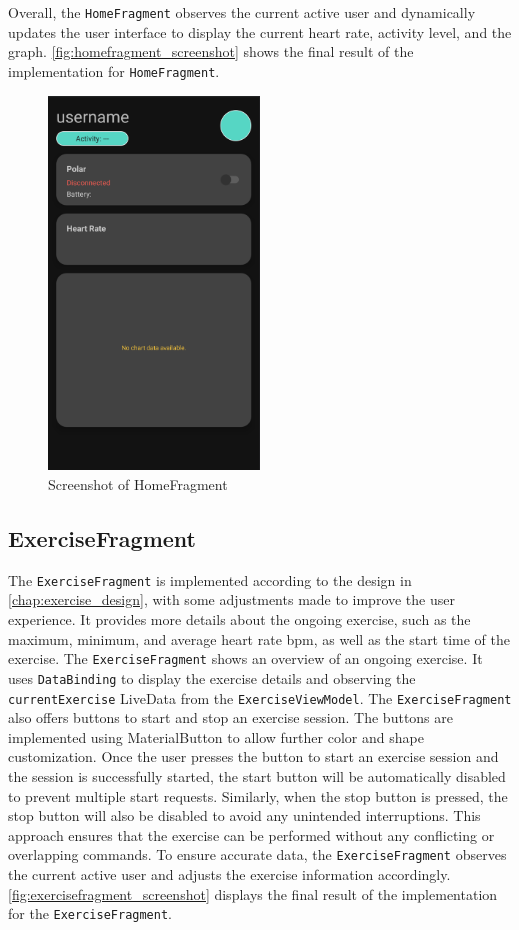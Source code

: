 Overall, the \texttt{HomeFragment} observes the current active user and dynamically updates the user interface to display the current heart rate, activity level, and the graph.
\autoref{fig:homefragment_screenshot} shows the final result of the implementation for \texttt{HomeFragment}.
\begin{figure}[H]
    \centering
    \includegraphics[width=0.5\textwidth]{images/homefragment-screenshot.png}
    \caption{Screenshot of HomeFragment}
    \label{fig:homefragment_screenshot}
\end{figure}

\subsection{ExerciseFragment}
The \texttt{ExerciseFragment} is implemented according to the design in \autoref{chap:exercise_design}, with some adjustments made to improve the user experience.
It provides more details about the ongoing exercise, such as the maximum, minimum, and average heart rate bpm, as well as the start time of the exercise.
The \texttt{ExerciseFragment} shows an overview of an ongoing exercise. It uses \texttt{DataBinding} to display the exercise details and observing the \texttt{currentExercise} LiveData from the \texttt{ExerciseViewModel}. 
The \texttt{ExerciseFragment} also offers buttons to start and stop an exercise session. The buttons are implemented using MaterialButton to allow further color and shape customization.
Once the user presses the button to start an exercise session and the session is successfully started, the start button will be automatically disabled to prevent multiple start requests. Similarly, when the stop button is pressed, the stop button will also be disabled to avoid any unintended interruptions. 
This approach ensures that the exercise can be performed without any conflicting or overlapping commands.
To ensure accurate data, the \texttt{ExerciseFragment} observes the current active user and adjusts the exercise information accordingly.
\autoref{fig:exercisefragment_screenshot} displays the final result of the implementation for the \texttt{ExerciseFragment}.

